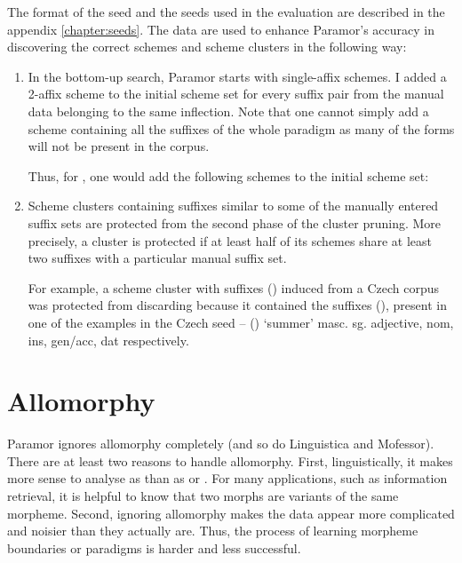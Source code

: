 \noindent
The format of the seed and the seeds used in the evaluation are described in the appendix \ref{chapter:seeds}. The data are used to enhance Paramor's accuracy in discovering the correct schemes and scheme clusters in the following way:
\begin{enumerate}
\item In the bottom-up search, Paramor starts with single-affix schemes. I added a 2-affix scheme to the initial scheme set for every suffix pair from the manual data belonging to the same inflection. Note that one cannot simply add a scheme containing all the suffixes of the whole paradigm as many of the forms will not be present in the corpus.

Thus, for , one would add the following schemes to the initial scheme set: 

\item Scheme clusters containing suffixes similar to some of the manually entered suffix sets are protected from the second phase of the cluster pruning. More precisely, a cluster is protected if at least half of its schemes share at least two suffixes with a particular manual suffix set.

For example, a scheme cluster with suffixes () induced from a Czech corpus was protected from discarding because it contained the suffixes (), present in one of the examples in the Czech seed -- () `summer' masc. sg. adjective, nom, ins, gen/acc, dat respectively.

\end{enumerate}

\section{Allomorphy}

Paramor ignores allomorphy completely (and so do Linguistica and Mofessor). There are at least two reasons to handle allomorphy. First, linguistically, it  makes  more  sense  to  analyse    as   than as   or . For  many  applications, such as information retrieval, it is helpful to know that two morphs are variants of the same morpheme.
%
Second, ignoring allomorphy makes the data appear more complicated and noisier than they actually are. Thus, the process of learning morpheme boundaries or paradigms is harder and less successful.

